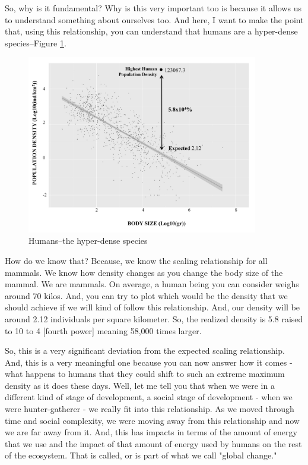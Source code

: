 \documentclass[]{article}
\begin{document}
So, why is it fundamental?
Why is this very important too
is because it allows us to understand
something about ourselves too.
And here, I want to make the point that,
using this relationship,
you can understand that humans
are a hyper-dense species--Figure \ref{fig:Hyperdense}.
\begin{figure}[H]
	\caption{Humans--the hyper-dense species}\label{fig:Hyperdense}
	\includegraphics[width=0.9\textwidth]{Hyperdense}
\end{figure}
How do we know that?
Because, we know the scaling
relationship for all mammals.
We know how density changes as you
change the body size of the mammal.
We are mammals.
On average, a human being
you can consider weighs around 70 kilos.
And, you can try to plot which would be
the density that we should achieve
if we will kind of
follow this relationship.
And, our density will be around
2.12 individuals per square kilometer.
So, the realized density is
5.8 raised to 10 to 4 [fourth power]
meaning 58,000 times larger.

So, this is a very significant deviation
from the expected scaling relationship.
And, this is a very meaningful one
because
you can now answer how it comes -
what happens to humans
that they could shift to
such an extreme maximum density
as it does these days.
Well, let me tell you that
when we were in a different kind of
stage of development,
a social stage of development -
when we were hunter-gatherer -
we really fit into this relationship.
As we moved through time
and social complexity,
we were moving away
from this relationship
and now we are far away from it.
And, this has impacts in terms of
the amount of energy that we use
and the impact of that amount of energy
used by humans
on the rest of the ecosystem.
That is called, or is part of
what we call "global change."
\end{document}
